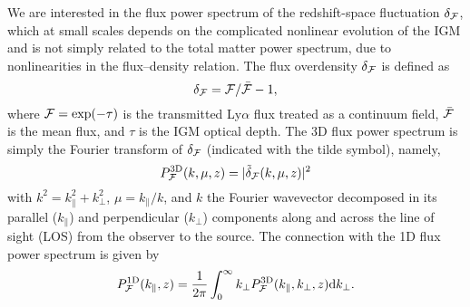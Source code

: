 \documentclass{emulateapj}
\begin{document}
We are interested in the 
flux power spectrum of the redshift-space fluctuation $\delta_{{\cal{F}}}$, which  at small scales 
depends on the complicated nonlinear evolution of the IGM and is not simply related to the 
total matter power spectrum, due to nonlinearities in the flux--density relation. 
The flux overdensity $\delta_{{\cal{F}}}$ is defined as
\begin{equation}
\delta_{\cal{F}} = {\cal{F}/\cal{\bar{F}}} - 1,
\label{}
\end{equation}
where ${\cal{F}} = \exp(-\tau)$
is the transmitted Ly$\alpha$ flux treated as a continuum field, ${\cal{\bar{F}}}$ is the mean flux,
and  $\tau$ is the IGM optical depth.
The 3D flux power spectrum 
is simply the Fourier transform 
of $\delta_{{\cal{F}}}$ (indicated with the tilde symbol), namely,
\begin{equation}
P^{\rm 3D}_{{\cal{F}}} (k, \mu, z) = | \tilde{\delta}_{{\cal{F}}}(k, \mu, z)|^2
\label{}
\end{equation}
with
$k^2=k^2_{\parallel} + k^2_{\perp}$,
$\mu = k_{\parallel} / k$, and $k$ the Fourier wavevector decomposed in its parallel ($k_{\parallel}$)
and perpendicular ($k_{\perp}$) components along and across the line of sight (LOS) from the observer to the source.  
The connection with the 1D flux power spectrum is given by
\begin{equation}
P^{\rm 1D}_{{\cal{F}}} (k_{\parallel},z) = {1 \over 2 \pi} \int_{0}^{\infty} k_{\perp}      P^{\rm 3D}_{{\cal{F}}}  (k_{\parallel}, k_{\perp},z) {\rm d}k_{\perp}. 
\label{}
\end{equation}
\end{document}
